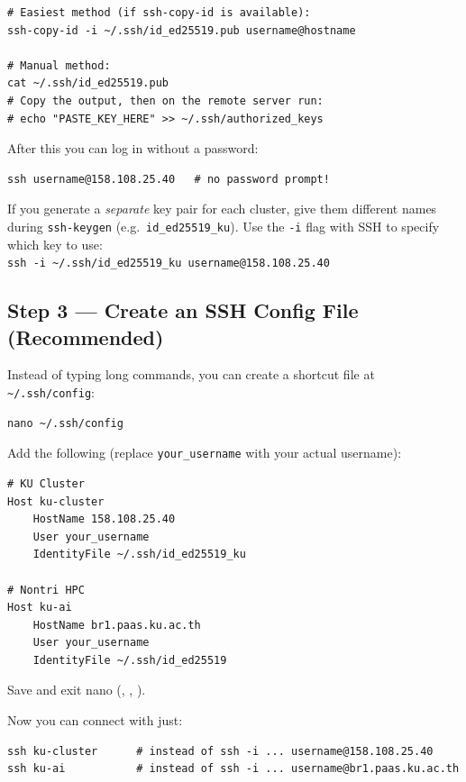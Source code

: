\documentclass[12pt,a4paper]{article}
\newcommand{\warn}[1]{%
  \begin{tcolorbox}[warnstyle]
    #1
  \end{tcolorbox}
}
\newcommand{\cmd}[1]{\texttt{\textcolor{kugreen!70!black}{#1}}}
\newcommand{\key}[1]{\fbox{\small\ttfamily #1}}
\begin{document}
\begin{lstlisting}[style=bash]
# Easiest method (if ssh-copy-id is available):
ssh-copy-id -i ~/.ssh/id_ed25519.pub username@hostname

# Manual method:
cat ~/.ssh/id_ed25519.pub
# Copy the output, then on the remote server run:
# echo "PASTE_KEY_HERE" >> ~/.ssh/authorized_keys
\end{lstlisting}

After this you can log in without a password:

\begin{lstlisting}[style=bash]
ssh username@158.108.25.40   # no password prompt!
\end{lstlisting}

\warn{
  If you generate a \emph{separate} key pair for each cluster, give them
  different names during \cmd{ssh-keygen} (e.g.\ \texttt{id\_ed25519\_ku}).
  Use the \texttt{-i} flag with SSH to specify which key to use:\\[4pt]
  \texttt{ssh -i \textasciitilde/.ssh/id\_ed25519\_ku username@158.108.25.40}
}

\subsection{Step 3 --- Create an SSH Config File (Recommended)}

Instead of typing long commands, you can create a shortcut file at
\texttt{\textasciitilde/.ssh/config}:

\begin{lstlisting}[style=bash]
nano ~/.ssh/config
\end{lstlisting}

Add the following (replace \texttt{your\_username} with your actual username):

\begin{lstlisting}[style=code]
# KU Cluster
Host ku-cluster
    HostName 158.108.25.40
    User your_username
    IdentityFile ~/.ssh/id_ed25519_ku

# Nontri HPC
Host ku-ai
    HostName br1.paas.ku.ac.th
    User your_username
    IdentityFile ~/.ssh/id_ed25519
\end{lstlisting}

Save and exit nano (\key{Ctrl+O}, \key{Enter}, \key{Ctrl+X}).

Now you can connect with just:

\begin{lstlisting}[style=bash]
ssh ku-cluster      # instead of ssh -i ... username@158.108.25.40
ssh ku-ai           # instead of ssh -i ... username@br1.paas.ku.ac.th
\end{lstlisting}
\end{document}
